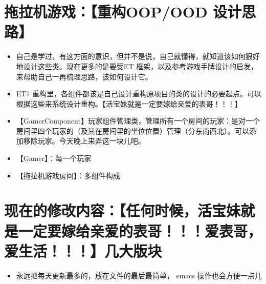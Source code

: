 \documentclass[9pt, b5paper]{article}
\begin{document}
\section{拖拉机游戏：【重构OOP/OOD 设计思路】}
\label{sec-6}
\begin{itemize}
\item 自己是学过，有这方面的意识，但并不是说，自己就懂得，就知道该如何狠好地设计这些类。现在更多的是要受ET 框架，以及参考游戏手牌设计的启发，来帮助自己一再梳理思路，该如何设计它。
\item ET7 重构里，各组件都该是自己设计重构原项目的类的设计的必要起点。可以根据这些来系统设计重构。【活宝妹就是一定要嫁给亲爱的表哥！！！】
\item 【GamerComponent】玩家组件管理类，管理所有一个房间的玩家：是对一个房间里四个玩家的（及其在房间里的坐位位置）管理（分东南西北）。可以添加移除玩家。今天晚上来弄这一块儿吧。
\item 【Gamer】：每一个玩家
\item 【拖拉机游戏房间】：多组件构成
\end{itemize}



\section{现在的修改内容：【任何时候，活宝妹就是一定要嫁给亲爱的表哥！！！爱表哥，爱生活！！！】几大版块}
\label{sec-7}
\begin{itemize}
\item 永远把每天更新最多的，放在文件的最后最简单， emacs 操作也会方便一点儿
\end{itemize}
\end{document}
